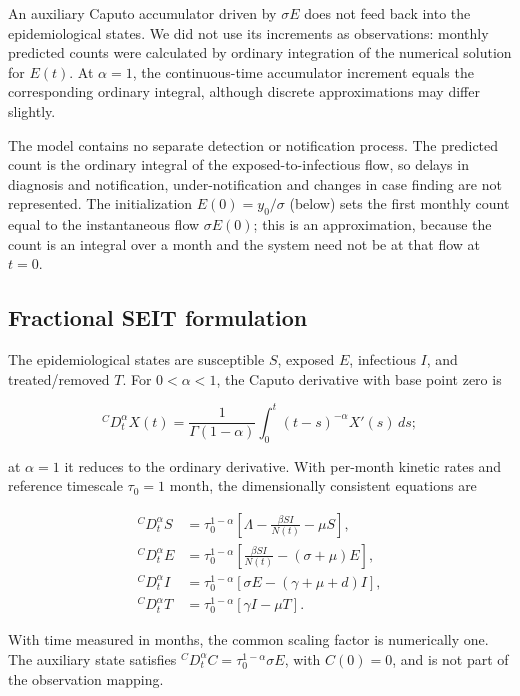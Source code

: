 \documentclass[pdflatex,sn-mathphys-ay]{sn-jnl}
\begin{document}
An auxiliary Caputo accumulator driven by $\sigma E$ does not feed back into the epidemiological states. We did not use its increments as observations: monthly predicted counts were calculated by ordinary integration of the numerical solution for $E(t)$. At $\alpha=1$, the continuous-time accumulator increment equals the corresponding ordinary integral, although discrete approximations may differ slightly.

The model contains no separate detection or notification process. The predicted count is the ordinary integral of the exposed-to-infectious flow, so delays in diagnosis and notification, under-notification and changes in case finding are not represented. The initialization $E(0)=y_0/\sigma$ (below) sets the first monthly count equal to the instantaneous flow $\sigma E(0)$; this is an approximation, because the count is an integral over a month and the system need not be at that flow at $t=0$.

\subsection{Fractional SEIT formulation}

The epidemiological states are susceptible $S$, exposed $E$, infectious $I$, and treated/removed $T$. For $0<\alpha<1$, the Caputo derivative with base point zero is

\[
{}^C D_t^\alpha X(t)=\frac{1}{\Gamma(1-\alpha)}\int_0^t(t-s)^{-\alpha}X'(s)\,ds;
\]

at $\alpha=1$ it reduces to the ordinary derivative. With per-month kinetic rates and reference timescale $\tau_0=1\text{ month}$, the dimensionally consistent equations are

\[
\begin{aligned}
{}^C D_t^\alpha S &=\tau_0^{1-\alpha}\left[\Lambda-\frac{\beta SI}{N(t)}-\mu S\right],\\
{}^C D_t^\alpha E &=\tau_0^{1-\alpha}\left[\frac{\beta SI}{N(t)}-(\sigma+\mu)E\right],\\
{}^C D_t^\alpha I &=\tau_0^{1-\alpha}\left[\sigma E-(\gamma+\mu+d)I\right],\\
{}^C D_t^\alpha T &=\tau_0^{1-\alpha}\left[\gamma I-\mu T\right].
\end{aligned}
\]

With time measured in months, the common scaling factor is numerically one. The auxiliary state satisfies ${}^C D_t^\alpha C=\tau_0^{1-\alpha}\sigma E$, with $C(0)=0$, and is not part of the observation mapping.
\end{document}
